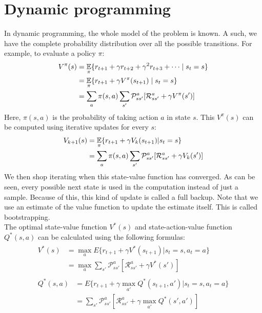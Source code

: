 \section{Dynamic programming}
\label{sub:rldp}
In dynamic programming, the whole model of the problem is known. A such, we have the complete probability distribution over all the possible transitions. For example, to evaluate a policy $\pi$:
\begin{align}
\begin{split}
V^{\pi}(s) &= \operatorname*{\mathop{{}\mathbb{E}}}_{\pi} \{r_{t+1} + \gamma r_{t+2} + \gamma^2r_{t+3}+\dots \mid s_t=s\}\\
&= \operatorname*{\mathop{{}\mathbb{E}}}_{\pi} \{r_{t+1} + \gamma V^{\pi}(s_{t+1}) \mid s_t=s\}\\
&= \sum_a \pi(s,a) \sum_{s'} \mathcal{P}^a_{ss'} [\mathcal{R}^a_{ss'} + \gamma V^{\pi}(s')]
\end{split}
\end{align}
Here, $\pi(s,a)$ is the probability of taking action $a$ in state $s$. This $V^{\pi}(s)$ can be computed using iterative updates for every $s$:
\begin{align}
\begin{split}
V_{k+1}(s) &= \operatorname*{\mathop{{}\mathbb{E}}}_{\pi}\{r_{t+1} + \gamma V_k(s_{t+1}) \vert s_t=s\}\\
&= \sum_a \pi(s,a) \sum_{s'}\mathcal{P}^a_{ss'} [\mathcal{R}^a_{ss'} + \gamma V_k(s')]
\end{split}
\end{align}
We then shop iterating when this state-value function has converged. As can be seen, every possible next state is used in the computation instead of just a sample. Because of this, this kind of update is called a full backup.
Note that we use an estimate of the value function to update the estimate itself. This is called bootstrapping.\\
The optimal state-value function $V^*(s)$ and state-action-value function $Q^*(s,a)$ can be calculated using the following formulas:
\begin{gather}
\begin{split}
V^{*}(s) &= \max_a E\{r_{t+1} + \gamma V^{*}(s_{t+1}) \vert s_t = s, a_t = a\}\\
&= \max_a \sum_{s'} \mathcal{P}^a_{ss'} [\mathcal{R}^a_{ss'}+\gamma V^{*}(s')]
\end{split}\\
\begin{split}
Q^{*}(s,a) &= E\{r_{t+1} + \gamma \max_{a'} Q^{*}(s_{t+1},a') \vert s_t=s, a_t=a\}\\
&= \sum_{s'} \mathcal{P}^a_{ss'} [\mathcal{R}^a_{ss'}+\gamma \max_{a'} Q^{*}(s',a')]
\end{split}
\end{gather}

